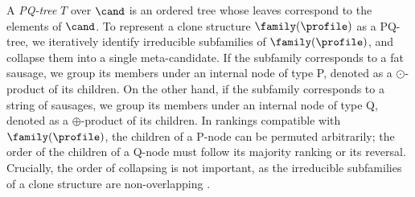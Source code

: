 A {\em PQ-tree} $T$ over $\cand$ is an ordered tree whose leaves correspond to the elements of $\cand$. To represent a clone structure $\family(\profile)$ as a PQ-tree, we iteratively identify irreducible subfamilies of $\family(\profile)$, and collapse them into a single meta-candidate. 
If the subfamily corresponds to a fat sausage, we group its members under an internal node of type P, denoted as a $\odot$-product of its children.
On the other hand, if the subfamily corresponds to a string of sausages, we group its members under an internal node of type Q, denoted as a $\oplus$-product of its children. 
In rankings compatible with $\family(\profile)$, the children of a P-node can be permuted arbitrarily; the order of the children of a Q-node must follow its majority ranking or its reversal. Crucially, the order of collapsing is not important, as the irreducible subfamilies of a clone structure are non-overlapping \cite[Prop. 4.2.]{Elkind10:Clone}. 

